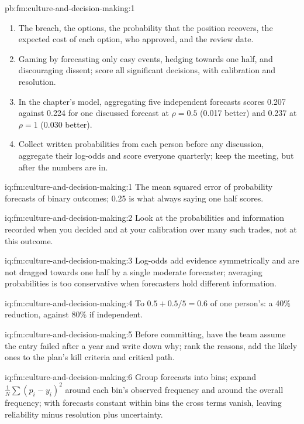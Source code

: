 \begin{solution}{pb:fm:culture-and-decision-making:1}
\begin{enumerate}
\item The breach, the options, the probability that the position recovers, the expected cost of each option, who approved, and the review date.
\item Gaming by forecasting only easy events, hedging towards one half, and discouraging dissent; score all significant decisions, with
calibration and resolution.
\item In the chapter's model, aggregating five independent forecasts scores 0.207 against 0.224 for one discussed forecast at $\rho=0.5$ (0.017
better) and 0.237 at $\rho=1$ (0.030 better).
\item Collect written probabilities from each person before any discussion, aggregate their log-odds and score everyone quarterly; keep the
meeting, but after the numbers are in.
\end{enumerate}
\end{solution}

\begin{solution}{iq:fm:culture-and-decision-making:1}
The mean squared error of probability forecasts of binary outcomes; 0.25 is what always saying one half scores.
\end{solution}

\begin{solution}{iq:fm:culture-and-decision-making:2}
Look at the probabilities and information recorded when you decided and at your calibration over many such trades, not at this outcome.
\end{solution}

\begin{solution}{iq:fm:culture-and-decision-making:3}
Log-odds add evidence symmetrically and are not dragged towards one half by a single moderate forecaster; averaging probabilities is too
conservative when forecasters hold different information.
\end{solution}

\begin{solution}{iq:fm:culture-and-decision-making:4}
To $0.5+0.5/5=0.6$ of one person's: a 40\% reduction, against 80\% if independent.
\end{solution}

\begin{solution}{iq:fm:culture-and-decision-making:5}
Before committing, have the team assume the entry failed after a year and write down why; rank the reasons, add the likely ones to the plan's
kill criteria and critical path.
\end{solution}

\begin{solution}{iq:fm:culture-and-decision-making:6}
Group forecasts into bins; expand $\frac1N\sum(p_i-y_i)^2$ around each bin's observed frequency and around the overall frequency; with forecasts
constant within bins the cross terms vanish, leaving reliability minus resolution plus uncertainty.
\end{solution}
